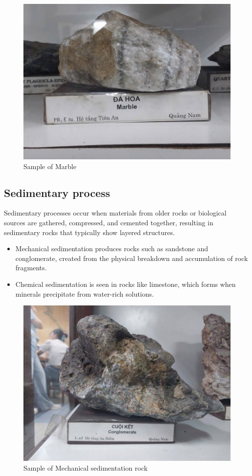 \begin{figure}[H]
  \centering
  \includegraphics[max width=0.8\linewidth]{graphics/figure_08.jpg}
  \caption{Sample of Marble}
  \label{fig:marble}
\end{figure}

\subsection{Sedimentary process}
\label{subsec:sedimentary-process}

Sedimentary processes occur when materials from older rocks or biological sources are gathered, compressed, and cemented together, resulting in sedimentary rocks that typically show layered structures.

\begin{itemize}
  \item Mechanical sedimentation produces rocks such as sandstone and conglomerate, created from the physical breakdown and accumulation of rock fragments.
  \item Chemical sedimentation is seen in rocks like limestone, which forms when minerals precipitate from water-rich solutions.
\end{itemize}

\begin{figure}[H]
  \centering
  \includegraphics[max width=0.8\linewidth]{graphics/figure_09.jpg}
  \caption{Sample of Mechanical sedimentation rock}
  \label{fig:mechanical-sedimentation}
\end{figure}

